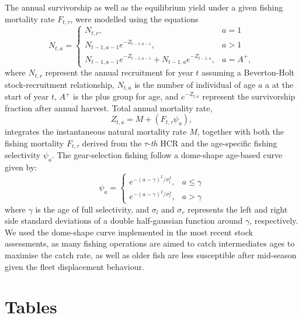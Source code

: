 \documentclass[11pt,letter,]{article}
\begin{document}
The annual survivorship as well as the equilibrium 
yield under a given fishing mortality rate $F_{t,\tau}$, were modelled 
using the equations
\[ 
N_{t,a}=\begin{cases} N_{t,r}, & a=1\\
N_{t-1,a-1}e^{-Z_{t-1,a-1}},& a>1\\
N_{t-1,a-1}e^{-Z_{t-1,a-1}} + N_{t-1,a}e^{-Z_{t-1,a}},& a=A^+,
\end{cases}  
\]
where $N_{t,r}$ represent the annual recruitment for year $t$ 
assuming a Beverton-Holt stock-recruitment relationship,  
$N_{t,a}$ is the number of individual 
of age $a$ a at the start of year $t$, $A^+$ is the plus group for age, and $e^{-Z_{t,a}}$ represent
the survivorship fraction after annual harvest. 
Total annual mortality rate,
\[ 
Z_{t,a}= M+\left( F_{t,\tau}\psi_{a}\right), 
\]
integrates the instantaneous 
natural mortality rate $M$, together with both the fishing mortality $F_{t,\tau}$
derived from the $\tau$-\textit{th} HCR and the age-specific 
fishing selectivity $\psi_a$. The gear-selection fishing follow a dome-shape age-based curve given by:
\[ 
\psi_{a}=\begin{cases}e^{-(a-\gamma)^2 / \sigma^{2}_l}, & a\leq \gamma\\
e^{-(a-\gamma)^2 / \sigma^{2}_r}, & a > \gamma
\end{cases}  
\]
where $\gamma$ is the age of full selectivity, and $\sigma_l$ and 
$\sigma_r$ represents the left and right side standard deviations 
of a double half-gaussian function around $\gamma$, respectively. We used the dome-shape curve implemented in the most recent stock assessments, as many fishing operations are aimed to catch intermediates ages to maximise the catch rate, as well as  older fish are less susceptible after mid-season given the fleet displacement behaviour.

\clearpage

\section{Tables}
\end{document}
